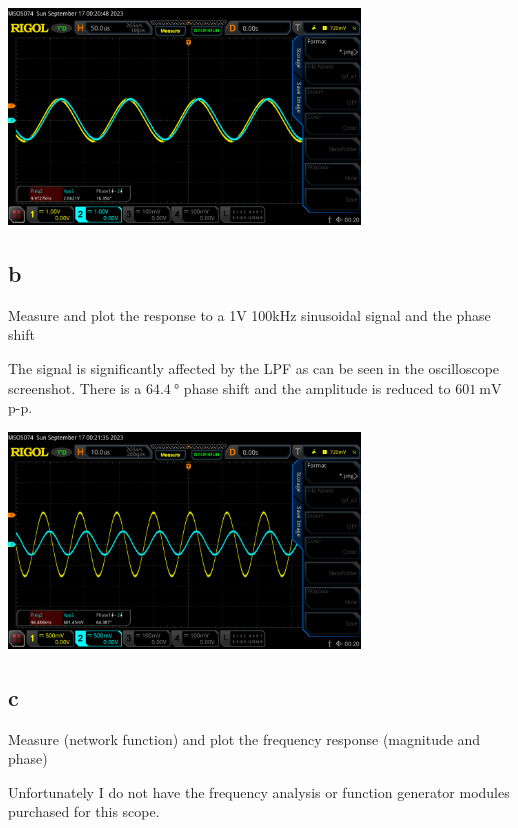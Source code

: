 \documentclass{article}
\begin{document}
	\begin{center}
	\includegraphics[width=0.7\textwidth]{lpf_a1}
	\end{center}
	
	\subsection*{b}
	
	Measure and plot the response to a 1V 100kHz sinusoidal signal and the phase shift
	
	The signal is significantly affected by the LPF as can be seen in the oscilloscope screenshot. There is a $\SI{64.4}{\degree}$ phase shift and the amplitude is reduced to $\SI{601}{\mV}$ p-p. 

	\begin{center}
	\includegraphics[width=0.7\textwidth]{lpf_a2}
	\end{center}
	
	\subsection*{c}
	
	Measure (network function) and plot the frequency response (magnitude and phase)


	Unfortunately I do not have the frequency analysis or function generator modules purchased for this scope.
\end{document}
